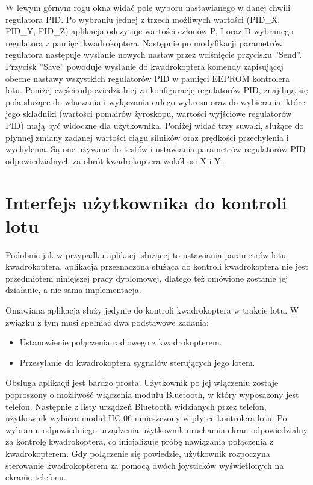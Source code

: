 W lewym górnym rogu okna widać pole wyboru nastawianego w danej chwili regulatora PID. Po wybraniu jednej z trzech możliwych wartości (PID\_X, PID\_Y, PID\_Z) aplikacja odczytuje wartości członów P, I oraz D wybranego regulatora z pamięci kwadrokoptera. Następnie po modyfikacji parametrów regulatora następuje wysłanie nowych nastaw przez wciśnięcie przycisku ''Send''. Przycisk ''Save'' powoduje wysłanie do kwadrokoptera komendy zapisującej obecne nastawy wszystkich regulatorów PID w pamięci EEPROM kontrolera lotu. Poniżej części odpowiedzialnej za konfigurację regulatorów PID, znajdują się pola służące do włączania i wyłączania całego wykresu oraz do wybierania, które jego składniki (wartości pomairów żyroskopu, wartości wyjściowe regulatorów PID) mają być widoczne dla użytkownika. Poniżej widać trzy suwaki, służące do płynnej zmiany zadanej wartości ciągu silników oraz prędkości przechylenia i wychylenia. Są one używane do testów i ustawiania parametrów regulatorów PID odpowiedzialnych za obrót kwadrokoptera wokół osi X i Y. 


\section{Interfejs użytkownika do kontroli lotu}

Podobnie jak w przypadku aplikacji służącej to ustawiania parametrów lotu kwadrokoptera, aplikacja przeznaczona służąca do kontroli kwadrokoptera nie jest przedmiotem niniejszej pracy dyplomowej, dlatego też omówione zostanie jej działanie, a nie sama implementacja.

Omawiana aplikacja służy jedynie do kontroli kwadrokoptera w trakcie lotu. W związku z tym musi spełniać dwa podstawowe zadania:
\begin{itemize}
	\item Ustanowienie połączenia radiowego z kwadrokopterem.
	\item Przesyłanie do kwadrokoptera sygnałów sterujących jego lotem.
\end{itemize}

Obsługa aplikacji jest bardzo prosta. Użytkownik po jej włączeniu zostaje poproszony o możliwość włączenia modułu Bluetooth, w który wyposażony jest telefon. Następnie z listy urządzeń Bluetooth widzianych przez telefon, użytkownik wybiera moduł HC-06 umieszczony w płytce kontrolera lotu. Po wybraniu odpowiedniego urządzenia użytkownik uruchamia ekran odpowiedzialny za kontrolę kwadrokoptera, co inicjalizuje próbę nawiązania połączenia z kwadrokopterem. Gdy połączenie się powiedzie, użytkownik rozpoczyna sterowanie kwadrokopterem za pomocą dwóch joysticków wyświetlonych na ekranie telefonu.

